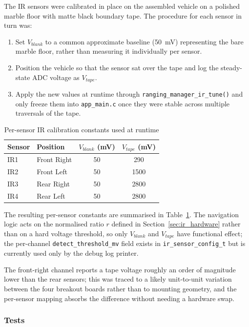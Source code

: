 The IR sensors were calibrated in place on the assembled vehicle on a polished marble floor with matte black boundary tape. The procedure for each sensor in turn was:
\begin{enumerate}
    \item Set $V_{blank}$ to a common approximate baseline (50~mV) representing the bare marble floor, rather than measuring it individually per sensor.
    \item Position the vehicle so that the sensor sat over the tape and log the steady-state ADC voltage as $V_{tape}$.
    \item Apply the new values at runtime through \texttt{ranging\_manager\_ir\_tune()} and only freeze them into \texttt{app\_main.c} once they were stable across multiple traversals of the tape.
\end{enumerate}

\begin{table}[h]
\centering
\begin{tabular}{|l|l|c|c|}
\hline
\textbf{Sensor} & \textbf{Position} & \textbf{$V_{blank}$ (mV)} & \textbf{$V_{tape}$ (mV)} \\
\hline
IR1 & Front Right & 50 & 290 \\
\hline
IR2 & Front Left & 50 & 1500 \\
\hline
IR3 & Rear Right & 50 & 2800 \\
\hline
IR4 & Rear Left & 50 & 2800 \\
\hline
\end{tabular}
\caption{Per-sensor IR calibration constants used at runtime}
\label{tab:ir_calibration}
\end{table}

The resulting per-sensor constants are summarised in Table~\ref{tab:ir_calibration}. The navigation logic acts on the normalised ratio $r$ defined in Section~\ref{sec:ir_hardware} rather than on a hard voltage threshold, so only $V_{blank}$ and $V_{tape}$ have functional effect; the per-channel \texttt{detect\_threshold\_mv} field exists in \texttt{ir\_sensor\_config\_t} but is currently used only by the debug log printer.

The front-right channel reports a tape voltage roughly an order of magnitude lower than the rear sensors; this was traced to a likely unit-to-unit variation between the four breakout boards rather than to mounting geometry, and the per-sensor mapping absorbs the difference without needing a hardware swap.

\subsubsection{Tests}

